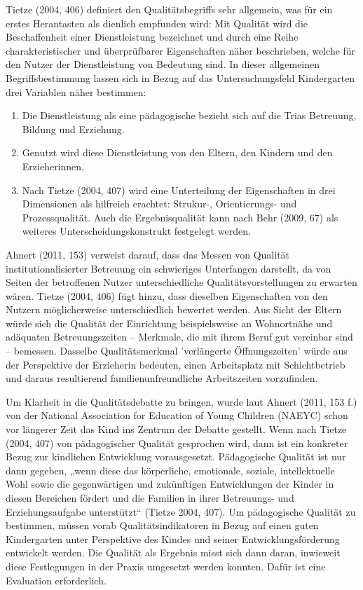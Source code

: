 Tietze (2004, 406) definiert den Qualitätsbegriffs sehr allgemein, was für ein erstes Herantasten als dienlich empfunden wird: Mit Qualität wird die Beschaffenheit einer Dienstleistung bezeichnet und durch eine Reihe charakteristischer und überprüfbarer Eigenschaften näher beschrieben, welche für den Nutzer der Dienstleistung von Bedeutung sind. In dieser allgemeinen Begriffsbestimmung lassen sich in Bezug auf das Untersuchungsfeld Kindergarten drei Variablen näher bestimmen: \begin{enumerate}
\item Die Dienstleistung als eine pädagogische bezieht sich auf die Trias Betreuung, Bildung und Erziehung.
\item Genutzt wird diese Dienstleistung von den Eltern, den Kindern und den Erzieherinnen.
\item Nach Tietze (2004, 407) wird eine Unterteilung der Eigenschaften in drei Dimensionen als hilfreich erachtet: Strukur-, Orientierungs- und Prozessqualität. Auch die Ergebnisqualität kann nach Behr (2009, 67) als weiteres Unterscheidungskonstrukt festgelegt werden.
\end{enumerate}

Ahnert (2011, 153) verweist darauf, dass das Messen von Qualität institutionalisierter Betreuung ein schwieriges Unterfangen darstellt, da von Seiten der betroffenen Nutzer unterschiedliche Qualitätsvorstellungen zu erwarten wären. Tietze (2004, 406) fügt hinzu, dass dieselben Eigenschaften von den Nutzern möglicherweise unterschiedlich bewertet werden. Aus Sicht der Eltern würde sich die Qualität der Einrichtung beispielsweise an Wohnortnähe und adäquaten Betreuungszeiten -- Merkmale, die mit ihrem Beruf gut vereinbar sind -- bemessen. Dasselbe Qualitätsmerkmal 'verlängerte Öffnungszeiten' würde aus der Perspektive der Erzieherin bedeuten, einen Arbeitsplatz mit Schichtbetrieb und daraus resultierend familienunfreundliche Arbeitszeiten vorzufinden.  

Um Klarheit in die Qualitätsdebatte zu bringen, wurde laut Ahnert (2011, 153 f.) von der National Association for Education of Young Children (NAEYC) schon vor längerer Zeit das Kind ins Zentrum der Debatte gestellt. Wenn nach Tietze (2004, 407) von pädagogischer Qualität gesprochen wird, dann ist ein konkreter Bezug zur kindlichen Entwicklung vorausgesetzt. Pädagogische Qualität ist nur dann gegeben, „wenn diese das körperliche, emotionale, soziale, intellektuelle Wohl sowie die gegenwärtigen und zukünftigen Entwicklungen der Kinder in diesen Bereichen fördert und die Familien in ihrer Betreuungs- und Erziehungsaufgabe unterstützt“ (Tietze 2004, 407). Um pädagogische Qualität zu bestimmen, müssen vorab Qualitätsindikatoren in Bezug auf einen guten Kindergarten unter Perspektive des Kindes und seiner Entwicklungsförderung entwickelt werden. Die Qualität als Ergebnis misst sich dann daran, inwieweit diese Festlegungen in der Praxis umgesetzt werden konnten. Dafür ist eine Evaluation erforderlich. 


